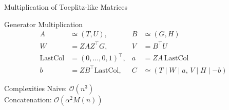 \begin{frame}{Multiplication of Toeplitz-like Matrices}
  \begin{block}{Generator Multiplication}
    \begin{align*}
      A &\simeq (T, U), & B &\simeq (G, H) \\
      W &= Z A Z^\top G, & V &= B^\top U \\
      \text{LastCol} &= (0, \dots, 0, 1)^\top, & a &= Z A \, \text{LastCol} \\
      b &= Z B^\top \text{LastCol}, & C &\simeq (T \mid W \mid a, \,
      V \mid H \mid -b)
    \end{align*}
  \end{block}

  \vspace{1em}

  \begin{block}{Complexities}
    Naive: $\mathcal{O}(n^3)$ \\
    Concatenation: $\mathcal{O}(\alpha^2 M(n))$
  \end{block}
\end{frame}
